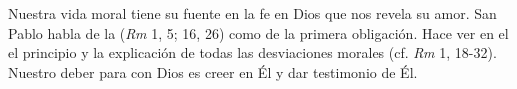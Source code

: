 	
	 Nuestra vida moral tiene su fuente en la fe en Dios que nos revela su amor. San Pablo habla de la  (\emph{Rm} 1, 5; 16, 26) como de la primera obligación. Hace ver en el  el principio y la explicación de todas las desviaciones morales (cf. \emph{Rm} 1, 18-32). Nuestro deber para con Dios es creer en Él y dar testimonio de Él.